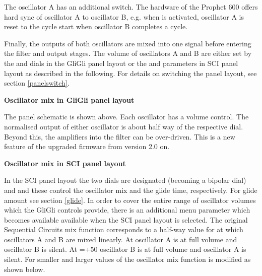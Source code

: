 The oscillator A has an additional \oscsync switch. The hardware of the Prophet 600 offers hard sync of oscillator A to oscillator B, e.g. when \oscsync is activated, oscillator A is reset to the cycle start when oscillator B completes a cycle. 

Finally, the outputs of both oscillators are mixed into one signal before entering the filter and output stages. The volume of oscillators A and B are either set by the \vola and \volb dials in the GliGli panel layout or the \mixer and \drive parameters in SCI panel layout as described in the following. For details on switching the panel layout, see section \ref{panelswitch}.

\textbf{Oscillator mix in GliGli panel layout}

The panel schematic is shown above. Each oscillator has a volume control. The normalised output of either oscillator is about half way of the respective dial. Beyond this, the amplifiers into the filter can be over-driven. This is a new feature of the upgraded firmware from version 2.0 on.

\textbf{Oscillator mix in SCI panel layout}

In the SCI panel layout the two dials are designated \mixer (becoming a bipolar dial) and \glidepot and these control the oscillator mix and the glide time, respectively. For glide amount see section \ref{glide}. In order to cover the entire range of oscillator volumes which the GliGli controls provide, there is an additional menu parameter \drive which becomes available available when the SCI panel layout is selected. The original Sequential Circuits mix function corresponds to a half-way value for \drive at which oscillators A and B are mixed linearly. At  oscillator A is at full volume and oscillator B is silent. At \mixer =+50 oscillator B is at full volume and oscillator A is silent.  For smaller and larger values of \drive the oscillator mix function is modified as shown below.


